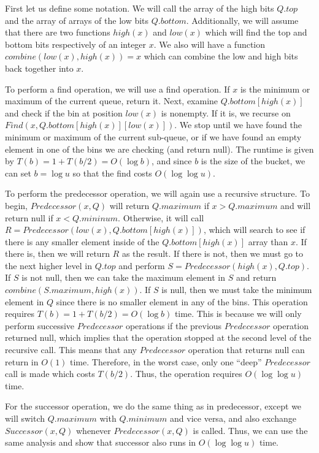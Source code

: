 \documentclass[psamsfonts]{amsart}
\newenvironment{sol}{\vspace{0.25cm}{\large \bfseries Solution:}}{\qedsymbol}
\begin{document}
\begin{sol}
First let us define some notation. We will call the array of the high bits $Q.top$ and the array of arrays of the low bits $Q.bottom$. Additionally, we will assume that there are two functions $high(x)$ and $low(x)$ which will find the top and bottom bits respectively of an integer $x$. We also will have a function $combine(low(x), high(x)) = x$ which can combine the low and high bits back together into $x$. 

To perform a find operation, we will use a find operation. If $x$ is the minimum or maximum of the current queue, return it. Next, examine $Q.bottom[high(x)]$ and check if the bin at position $low(x)$ is nonempty. If it is, we recurse on $Find(x, Q.bottom[high(x)][low(x)])$. We stop until we have found the minimum or maximum of the current sub-queue, or if we have found an empty element in one of the bins we are checking (and return null). The runtime is given by $T(b) = 1 + T(b/2) = O(\log b)$, and since $b$ is the size of the bucket, we can set $b = \log u$ so that the find costs $O(\log \log u)$.

To perform the predecessor operation, we will again use a recursive structure. To begin, $Predecessor(x, Q)$ will return $Q.maximum$ if $x > Q.maximum$ and will return null if $x < Q.mininum$. Otherwise, it will call $R = Predecessor(low(x), Q.bottom[high(x)])$, which will search to see if there is any smaller element inside of the $Q.bottom[high(x)]$ array than $x$. If there is, then we will return $R$ as the result. If there is not, then we must go to the next higher level in $Q.top$ and perform $S = Predecessor(high(x), Q.top)$. If $S$ is not null, then we can take the maximum element in $S$ and return $combine(S.maximum, high(x))$. If $S$ is null, then we must take the minimum element in $Q$ since there is no smaller element in any of the bins. This operation requires $T(b) = 1 + T(b/2) = O(\log b)$ time. This is because we will only perform successive $Predecessor$ operations if the previous $Predecessor$ operation returned null, which implies that the operation stopped at the second level of the recursive call. This means that any $Predecessor$ operation that returns null can return in $O(1)$ time. Therefore, in the worst case, only one ``deep'' $Predecessor$ call is made which costs $T(b/2)$. Thus, the operation requires $O(\log \log u)$ time.  

For the successor operation, we do the same thing as in predecessor, except we will switch $Q.maximum$ with $Q.minimum$ and vice versa, and also exchange $Successor(x, Q)$ whenever $Predecessor(x,Q)$ is called. Thus, we can use the same analysis and show that successor also runs in $O(\log \log u)$ time.
\end{sol}
\end{document}
